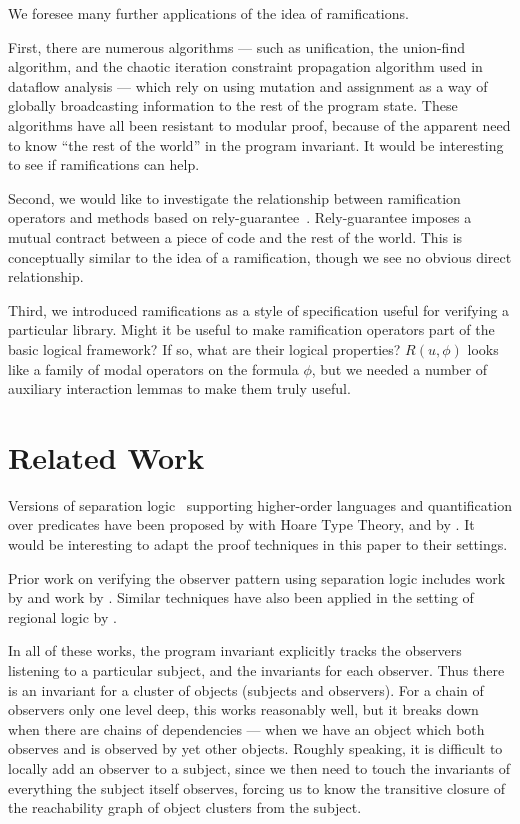 \documentclass[preprint,natbib]{sigplanconf}
\begin{document}
We foresee many further applications of the idea of ramifications.

First, there are numerous algorithms --- such as unification, the
union-find algorithm, and the chaotic iteration constraint propagation
algorithm used in dataflow analysis --- which rely on using mutation
and assignment as a way of globally broadcasting information to the
rest of the program state. These algorithms have all been resistant to
modular proof, because of the apparent need to know ``the rest of the
world'' in the program invariant. It would be interesting to see if
ramifications can help.

Second, we would like to investigate the relationship between
ramification operators and methods based on
rely-guarantee~\cite{rely-guarantee-jones}. Rely-guarantee imposes a
mutual contract between a piece of code and the rest of the world.
This is conceptually similar to the idea of a ramification, though we
see no obvious direct relationship.

Third, we introduced ramifications as a style of
specification useful for verifying a particular library. Might it be
 useful to make ramification operators part of the basic
logical framework? If so, what are their logical properties? $R(u,
\phi)$ looks like a family of modal operators on the formula $\phi$, but
we needed a number of auxiliary interaction
lemmas to make them truly useful.

\section{Related Work}

Versions of separation logic~\cite{sep-logic} supporting higher-order
languages and quantification over predicates have been proposed by
\citet{htt} with Hoare Type Theory, and by
\citet{parkinson-bierman}. It would be interesting to adapt the
proof techniques in this paper to their settings.

Prior work on verifying the observer pattern using separation logic
includes work by \citet{tldi09,ftfjp07} and work by
\citet{parkinson-iwaco-07}. Similar techniques have also been applied
in the setting of regional logic by \citet{banerjee-naumann-regions}.

In all of these works, the program invariant explicitly tracks the
observers listening to a particular subject, and the invariants for
each observer. Thus there is an invariant for a cluster of objects
(subjects and observers). For a chain of observers only one level
deep, this works reasonably well, but it breaks down when there are
chains of dependencies --- when we have an object which both observes
and is observed by yet other objects. Roughly speaking, it is
difficult to locally add an observer to a subject, since we then need
to touch the invariants of everything the subject itself observes,
forcing us to know the transitive closure of the reachability graph of
object clusters from the subject. 
\end{document}
